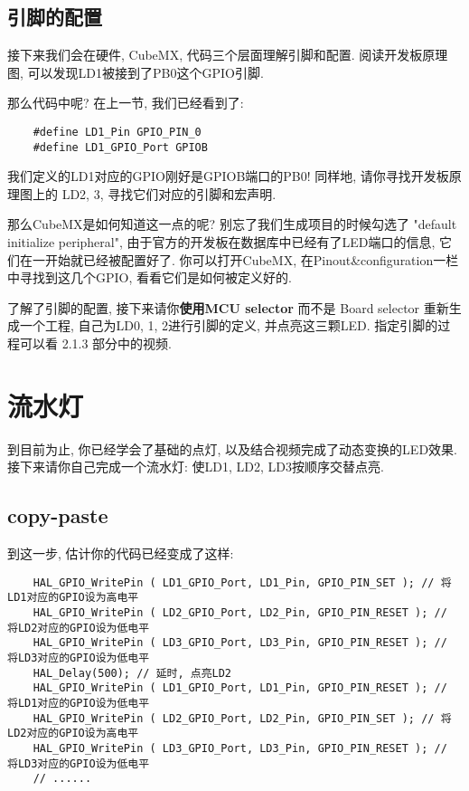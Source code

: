 \subsection{引脚的配置}

接下来我们会在硬件, CubeMX, 代码三个层面理解引脚和配置. 阅读开发板原理图, 可以发现LD1被接到了PB0这个GPIO引脚.

那么代码中呢? 在上一节, 我们已经看到了:
\begin{lstlisting}
	#define LD1_Pin GPIO_PIN_0
	#define LD1_GPIO_Port GPIOB
\end{lstlisting}

我们定义的LD1对应的GPIO刚好是GPIOB端口的PB0! 同样地, 请你寻找开发板原理图上的 LD2, 3, 寻找它们对应的引脚和宏声明.

那么CubeMX是如何知道这一点的呢? 别忘了我们生成项目的时候勾选了 "default initialize peripheral", 由于官方的开发板在数据库中已经有了LED端口的信息, 它们在一开始就已经被配置好了. 你可以打开CubeMX, 在Pinout\&configuration一栏中寻找到这几个GPIO, 看看它们是如何被定义好的.

\begin{theorem}
	了解了引脚的配置, 接下来请你\textbf{使用MCU selector} 而不是 Board selector 重新生成一个工程, 自己为LD0, 1, 2进行引脚的定义, 并点亮这三颗LED. 指定引脚的过程可以看 2.1.3 部分中的视频.
\end{theorem}

\section{流水灯}

到目前为止, 你已经学会了基础的点灯, 以及结合视频完成了动态变换的LED效果. 接下来请你自己完成一个流水灯: 使LD1, LD2, LD3按顺序交替点亮.

\subsection{copy-paste}

到这一步, 估计你的代码已经变成了这样:
\begin{lstlisting}
	HAL_GPIO_WritePin ( LD1_GPIO_Port, LD1_Pin, GPIO_PIN_SET ); // 将LD1对应的GPIO设为高电平
	HAL_GPIO_WritePin ( LD2_GPIO_Port, LD2_Pin, GPIO_PIN_RESET ); // 将LD2对应的GPIO设为低电平
	HAL_GPIO_WritePin ( LD3_GPIO_Port, LD3_Pin, GPIO_PIN_RESET ); // 将LD3对应的GPIO设为低电平
	HAL_Delay(500); // 延时, 点亮LD2
	HAL_GPIO_WritePin ( LD1_GPIO_Port, LD1_Pin, GPIO_PIN_RESET ); // 将LD1对应的GPIO设为低电平
	HAL_GPIO_WritePin ( LD2_GPIO_Port, LD2_Pin, GPIO_PIN_SET ); // 将LD2对应的GPIO设为高电平
	HAL_GPIO_WritePin ( LD3_GPIO_Port, LD3_Pin, GPIO_PIN_RESET ); // 将LD3对应的GPIO设为低电平
	// ......
\end{lstlisting}

